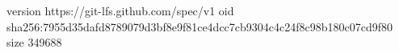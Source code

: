 version https://git-lfs.github.com/spec/v1
oid sha256:7955d35dafd8789079d3bf8e9f81ce4dcc7cb9304c4c24f8c98b180c07cd9f80
size 349688
